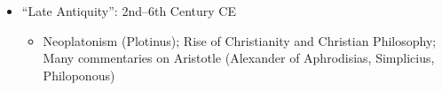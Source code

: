 \documentclass[oneside]{article}
\begin{document}
\begin{itemize}
\begin{itemize}
\end{itemize}
\item{``Late Antiquity'': 2nd--6th Century CE}
\begin{itemize}
\item{Neoplatonism (Plotinus); Rise of Christianity and Christian Philosophy; Many commentaries on Aristotle (Alexander of Aphrodisias, Simplicius, Philoponous)}
\end{itemize}
\end{itemize}






\end{document}
